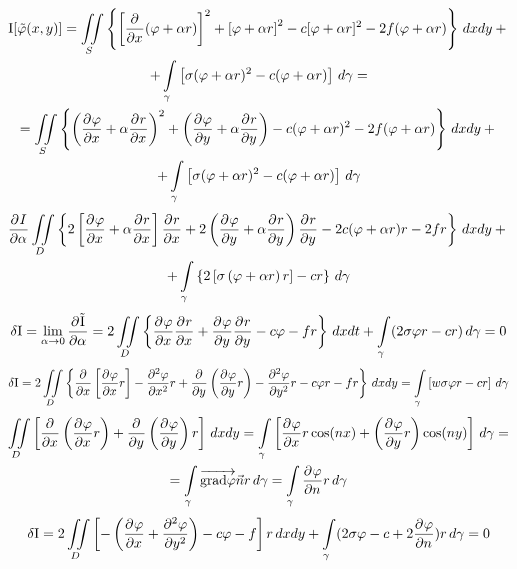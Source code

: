 \begin{multline*}
	\mathrm{I} [\tilde \varphi(x, y)] = \iint\limits_S \left\{\left[ \frac{\partial^{}}{\partial x^{}} (\varphi + \alpha r) \right]^2 + \left[\varphi + \alpha r \right]^2  - c [\varphi + \alpha r]^2 - 2 f (\varphi + \alpha r)\right\}\, dx dy  +{}
	\\+ \int\limits_\gamma \left[ \sigma (\varphi + \alpha r)^2 - c (\varphi + \alpha r) \right]\, d\gamma = \\
	= \iint\limits_S \left\{\left(\frac{\partial^{}\varphi}{\partial x^{}} + \alpha \frac{\partial^{}r}{\partial x^{}} \right)^2 + \left(\frac{\partial^{}\varphi}{\partial y^{}} + \alpha \frac{\partial^{}r}{\partial y^{}}\right) - c (\varphi + \alpha r)^2 - 2 f (\varphi + \alpha r)\right\}\, dx dy +{}
	\\+ \int\limits_\gamma \left[\sigma (\varphi + \alpha r)^2 - c (\varphi + \alpha r) \right]\, d\gamma
\end{multline*}
\begin{multline*}
	\frac{\partial^{}I}{\partial \alpha^{}} \iint\limits_D \left\{ 2 \left[\frac{\partial^{}\varphi}{\partial x^{}} + \alpha \frac{\partial^{}r}{\partial x^{}} \right] \frac{\partial^{}r}{\partial x^{}} + 2 \left(\frac{\partial^{}\varphi}{\partial y^{}} + \alpha \frac{\partial^{}r}{\partial y^{}} \right) \frac{\partial^{}r}{\partial y^{}}  - 2 c (\varphi + \alpha r) r - 2 f r \right\}\, dx dy +{}\\
	+ \int\limits_\gamma \left\{2 \left[\sigma \left(\varphi + \alpha r \right)r \right] - c r\right\}\, d \gamma
\end{multline*}
\[
	\delta \mathrm{I} = \lim\limits_{\alpha \to 0} \frac{\partial^{}\tilde{\mathrm{I}}}{\partial \alpha^{}} = 2 \iint\limits_D \left\{ \frac{\partial^{}\varphi}{\partial x^{}} \frac{\partial^{}r}{\partial x^{}} + \frac{\partial^{}\varphi}{\partial y^{}} \frac{\partial^{}r}{\partial y^{}} - c \varphi - f r \right\}\, dx dt + \int\limits_\gamma (2 \sigma \varphi r - c r)\, d \gamma = 0
\]
\[
	\delta \mathrm{I} = 2 \iint\limits_D \left\{\frac{\partial^{}}{\partial x^{}} \left[\frac{\partial^{}\varphi}{\partial x^{}} r \right] - \frac{\partial^{2}\varphi}{\partial x^{2}} r + \frac{\partial^{}}{\partial y^{}} \left(\frac{\partial^{}\varphi}{\partial y^{}} r \right) - \frac{\partial^{2}\varphi}{\partial y^{2}} r - c \varphi r - f r\right\}\, dx dy =
	\int\limits_\gamma \left[ w \sigma \varphi r - c r \right]\, d\gamma
\]
\begin{multline*}
	\iint\limits_D \left[\frac{\partial^{}}{\partial x^{}} \left( \frac{\partial^{}\varphi}{\partial x^{}} r \right) + \frac{\partial^{}}{\partial y^{}} \left( \frac{\partial^{}\varphi}{\partial y^{}} \right) r \right]\, dx dy 
	= \int\limits_\gamma \left[ \frac{\partial^{}\varphi}{\partial x^{}} r \cos (n x) + \left(\frac{\partial^{}\varphi}{\partial y^{}} r \right) \cos (n y) \right]\, d\gamma=\\
	= \int\limits_\gamma \overrightarrow{\mathrm{grad} \varphi} \vec n r\, d\gamma = \int\limits_\gamma \frac{\partial^{}\varphi}{\partial n^{}} r\, d\gamma
\end{multline*}
\[
	\delta \mathrm{I} = 2 \iint\limits_D \left[- \left(\frac{\partial^{}\varphi}{\partial x^{}} + \frac{\partial^{2}\varphi}{\partial y^{2}}\right) - c \varphi - f \right] r \, dx dy + \int\limits_\gamma (2 \sigma \varphi - c + 2 \frac{\partial^{}\varphi}{\partial n^{}}) r \, d\gamma = 0
\]

